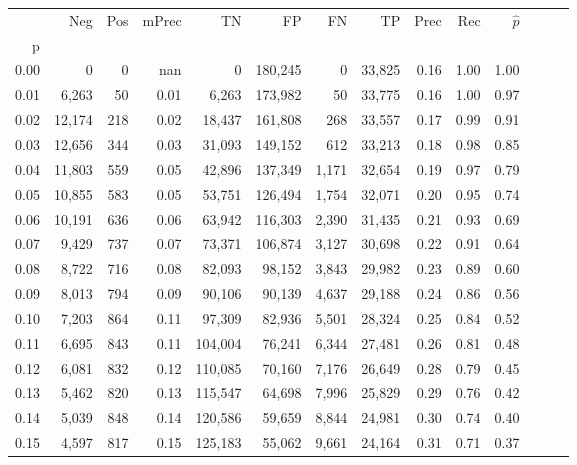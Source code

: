 \begin{tabular}{rrrrrrrrrrrrrr}
\toprule
{} &     Neg &  Pos & mPrec &       TN &       FP &      FN &      TP &  Prec &   Rec & $\hat{p}$ \\
p    &         &      &       &          &          &         &         &       &       &           \\
\midrule
0.00 &       0 &    0 &   nan &        0 &  180,245 &       0 &  33,825 &  0.16 &  1.00 &      1.00 \\
0.01 &   6,263 &   50 &  0.01 &    6,263 &  173,982 &      50 &  33,775 &  0.16 &  1.00 &      0.97 \\
0.02 &  12,174 &  218 &  0.02 &   18,437 &  161,808 &     268 &  33,557 &  0.17 &  0.99 &      0.91 \\
0.03 &  12,656 &  344 &  0.03 &   31,093 &  149,152 &     612 &  33,213 &  0.18 &  0.98 &      0.85 \\
0.04 &  11,803 &  559 &  0.05 &   42,896 &  137,349 &   1,171 &  32,654 &  0.19 &  0.97 &      0.79 \\
0.05 &  10,855 &  583 &  0.05 &   53,751 &  126,494 &   1,754 &  32,071 &  0.20 &  0.95 &      0.74 \\
0.06 &  10,191 &  636 &  0.06 &   63,942 &  116,303 &   2,390 &  31,435 &  0.21 &  0.93 &      0.69 \\
0.07 &   9,429 &  737 &  0.07 &   73,371 &  106,874 &   3,127 &  30,698 &  0.22 &  0.91 &      0.64 \\
0.08 &   8,722 &  716 &  0.08 &   82,093 &   98,152 &   3,843 &  29,982 &  0.23 &  0.89 &      0.60 \\
0.09 &   8,013 &  794 &  0.09 &   90,106 &   90,139 &   4,637 &  29,188 &  0.24 &  0.86 &      0.56 \\
0.10 &   7,203 &  864 &  0.11 &   97,309 &   82,936 &   5,501 &  28,324 &  0.25 &  0.84 &      0.52 \\
0.11 &   6,695 &  843 &  0.11 &  104,004 &   76,241 &   6,344 &  27,481 &  0.26 &  0.81 &      0.48 \\
0.12 &   6,081 &  832 &  0.12 &  110,085 &   70,160 &   7,176 &  26,649 &  0.28 &  0.79 &      0.45 \\
0.13 &   5,462 &  820 &  0.13 &  115,547 &   64,698 &   7,996 &  25,829 &  0.29 &  0.76 &      0.42 \\
0.14 &   5,039 &  848 &  0.14 &  120,586 &   59,659 &   8,844 &  24,981 &  0.30 &  0.74 &      0.40 \\
0.15 &   4,597 &  817 &  0.15 &  125,183 &   55,062 &   9,661 &  24,164 &  0.31 &  0.71 &      0.37 \\

\end{tabular}
